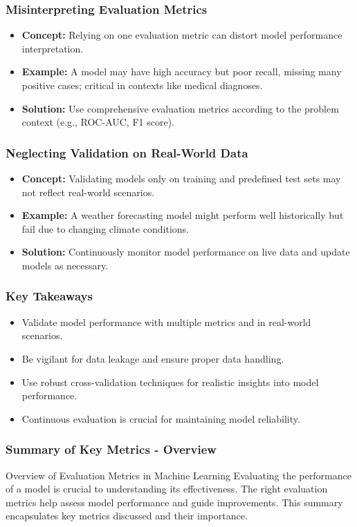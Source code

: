 \documentclass[aspectratio=169]{beamer}
\begin{document}
\begin{frame}[fragile]
  \frametitle{Misinterpreting Evaluation Metrics}
  \begin{itemize}
    \item \textbf{Concept:} Relying on one evaluation metric can distort model performance interpretation.
    \item \textbf{Example:} A model may have high accuracy but poor recall, missing many positive cases; critical in contexts like medical diagnoses.
    \item \textbf{Solution:} Use comprehensive evaluation metrics according to the problem context (e.g., ROC-AUC, F1 score).
  \end{itemize}
\end{frame}

\begin{frame}[fragile]
  \frametitle{Neglecting Validation on Real-World Data}
  \begin{itemize}
    \item \textbf{Concept:} Validating models only on training and predefined test sets may not reflect real-world scenarios.
    \item \textbf{Example:} A weather forecasting model might perform well historically but fail due to changing climate conditions.
    \item \textbf{Solution:} Continuously monitor model performance on live data and update models as necessary.
  \end{itemize}
\end{frame}

\begin{frame}[fragile]
  \frametitle{Key Takeaways}
  \begin{itemize}
    \item Validate model performance with multiple metrics and in real-world scenarios.
    \item Be vigilant for data leakage and ensure proper data handling.
    \item Use robust cross-validation techniques for realistic insights into model performance.
    \item Continuous evaluation is crucial for maintaining model reliability.
  \end{itemize}
\end{frame}

\begin{frame}[fragile]
    \frametitle{Summary of Key Metrics - Overview}
    \begin{block}{Overview of Evaluation Metrics in Machine Learning}
        Evaluating the performance of a model is crucial to understanding its effectiveness. 
        The right evaluation metrics help assess model performance and guide improvements. 
        This summary encapsulates key metrics discussed and their importance.
    \end{block}
\end{frame}
\end{document}
